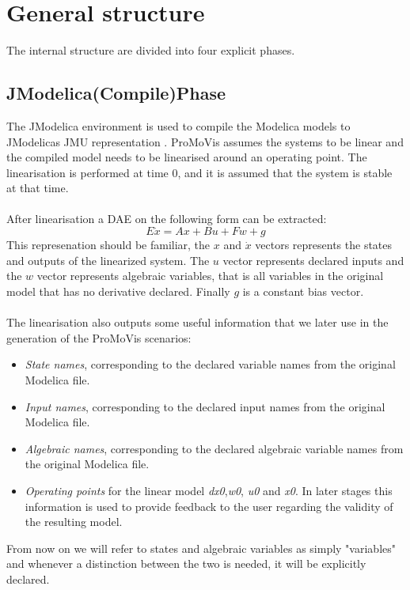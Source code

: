 \section{General structure}
The internal structure are divided into four explicit phases. 
\subsection{JModelica(Compile)Phase}
The JModelica environment is used to compile the Modelica models to JModelicas JMU representation \cite{jmodelicaorg}\nocite{*}. ProMoVis assumes the systems to be linear and the compiled model needs to be linearised around an operating point. The linearisation is performed at time 0, and it is assumed that the system is stable at that time.\\\\After linearisation a DAE on the following form can be extracted:
\begin{equation}
E\dot{x} = Ax + Bu + Fw + g
\end{equation}
This represenation should be familiar, the $x$ and $\dot{x}$  vectors represents the states and outputs of the linearized system. The $u$ vector represents declared inputs and the $w$ vector represents algebraic variables, that is all variables in the original model that has no derivative declared. Finally $g$ is a constant bias vector.\\\\The linearisation also outputs some useful information that we later use in the generation of the ProMoVis scenarios:
\begin{itemize}
\item \textit{State names}, corresponding to the declared variable names from the original Modelica file.
\item \textit{Input names}, corresponding to the declared input names from the original Modelica file.
\item \textit{Algebraic names}, corresponding to the declared algebraic variable names from the original Modelica file.
\item \textit{Operating points} for the linear model \textit{dx0},\textit{w0}, \textit{u0} and \textit{x0}. In later stages this information is used to provide feedback to the user regarding the validity of the resulting model.
\end{itemize}
From now on we will refer to states and algebraic variables as simply "variables" and whenever a distinction between the two is needed, it will be explicitly declared. 

